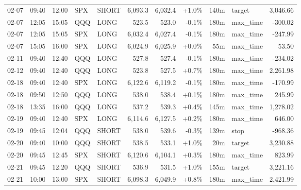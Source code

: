 \documentclass[11pt,a4paper,twoside]{article}
\begin{document}
\begin{center}
\begin{longtable}{>{\color{txtmain}}l l l l l r r r r >{\color{txtmain}}l r}
02-07 & 09:40 & 12:00 & SPX & SHORT & 6,093.3 & 6,032.4 & \textcolor{wingreen}{+1.0\%} & 140m & target & \textcolor{wingreen}{3,046.66} \\
02-07 & 12:05 & 15:05 & QQQ & LONG & 523.5 & 523.0 & \textcolor{lossred}{-0.1\%} & 180m & max\_time & \textcolor{lossred}{-300.02} \\
02-07 & 12:05 & 15:05 & SPX & LONG & 6,032.4 & 6,027.4 & \textcolor{lossred}{-0.1\%} & 180m & max\_time & \textcolor{lossred}{-247.99} \\
02-07 & 15:05 & 16:00 & SPX & LONG & 6,024.9 & 6,025.9 & \textcolor{wingreen}{+0.0\%} & 55m & max\_time & \textcolor{wingreen}{53.50} \\
02-11 & 09:40 & 12:40 & QQQ & LONG & 527.8 & 527.4 & \textcolor{lossred}{-0.1\%} & 180m & max\_time & \textcolor{lossred}{-234.02} \\
02-12 & 09:40 & 12:40 & QQQ & LONG & 523.8 & 527.5 & \textcolor{wingreen}{+0.7\%} & 180m & max\_time & \textcolor{wingreen}{2,261.98} \\
02-18 & 09:40 & 12:40 & SPX & LONG & 6,122.6 & 6,119.2 & \textcolor{lossred}{-0.1\%} & 180m & max\_time & \textcolor{lossred}{-170.99} \\
02-18 & 09:50 & 12:50 & QQQ & LONG & 538.0 & 538.4 & \textcolor{wingreen}{+0.1\%} & 180m & max\_time & \textcolor{wingreen}{245.99} \\
02-18 & 13:35 & 16:00 & QQQ & LONG & 537.2 & 539.3 & \textcolor{wingreen}{+0.4\%} & 145m & max\_time & \textcolor{wingreen}{1,278.02} \\
02-19 & 09:40 & 12:40 & SPX & LONG & 6,114.6 & 6,127.5 & \textcolor{wingreen}{+0.2\%} & 180m & max\_time & \textcolor{wingreen}{646.00} \\
02-19 & 09:45 & 12:04 & QQQ & SHORT & 538.0 & 539.6 & \textcolor{lossred}{-0.3\%} & 139m & stop & \textcolor{lossred}{-968.36} \\
02-20 & 09:40 & 10:00 & QQQ & SHORT & 538.5 & 533.1 & \textcolor{wingreen}{+1.0\%} & 20m & target & \textcolor{wingreen}{3,230.88} \\
02-20 & 09:45 & 12:45 & SPX & SHORT & 6,120.6 & 6,104.1 & \textcolor{wingreen}{+0.3\%} & 180m & max\_time & \textcolor{wingreen}{823.99} \\
02-21 & 09:45 & 12:20 & QQQ & SHORT & 536.9 & 531.5 & \textcolor{wingreen}{+1.0\%} & 155m & target & \textcolor{wingreen}{3,221.16} \\
02-21 & 10:00 & 13:00 & SPX & SHORT & 6,098.3 & 6,049.9 & \textcolor{wingreen}{+0.8\%} & 180m & max\_time & \textcolor{wingreen}{2,421.99} \\

\end{longtable}
\end{center}
\end{document}

